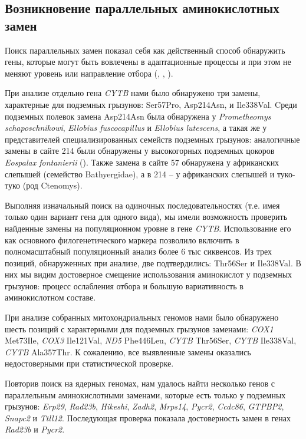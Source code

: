 \subsection{Возникновение параллельных аминокислотных замен}

Поиск параллельных замен показал себя как действенный способ обнаружить гены, которые могут быть вовлечены в адаптационные процессы и при этом не меняют уровень или направление отбора (\cite{Davies2018}, \cite{Zhou2015}, \cite{Sackman2017}). 

При анализе отдельно гена \textit{CYTB} нами было обнаружено три замены, характерные для подземных грызунов: Ser57Pro, Asp214Asn, и Ile338Val. Cреди подземных полевок замена Asp214Asn была обнаружена у \textit{Prometheomys schaposchnikowi}, \textit{Ellobius fuscocapillus} и \textit{Ellobius lutescens}, а такая же у представителей специализированных семейств подземных грызунов: аналогичные замены в сайте 214 были обнаружены у высокогорных подземных цокоров \textit{Eospalax fontanierii} (\cite{Cooper1993}). Также замена в сайте 57 обнаружена у африканских слепышей (семейство Bathyergidae), а в 214 -- у африканских слепышей и туко-туко (род Ctenomys).  

Выполняя изначальный поиск на одиночных последовательностях (т.е. имея только один вариант гена для одного вида), мы имели возможность проверить найденные замены на популяционном уровне в гене \textit{CYTB}. Использование его как основного филогенетического маркера позволило включить в полномасштабный популяционный анализ более 6 тыс сиквенсов. Из трех позиций, обнаруженных при анализе, две подтвердились: Thr56Ser и Ile338Val. В них мы видим достоверное смещение использования аминокислот у подземных грызунов: процесс ослабления отбора и большую вариативность в аминокислотном составе. 


При анализе собранных митохондриальных геномов нами было обнаружено шесть позиций с характерными для подземных грызунов заменами: \textit{COX1} Met73Ile, \textit{COX3} Ile121Val, \textit{ND5} Phe446Leu, \textit{CYTB} Thr56Ser, \textit{CYTB} Ile338Val, \textit{CYTB} Ala357Thr. К сожалению, все выявленные замены оказались недостоверными при статистической проверке. 

 
Повторив поиск на ядерных геномах, нам удалось найти несколько генов с параллельным аминокислотными заменами, которые есть только у подземных грызунов: \textit{Erp29}, \textit{Rad23b}, \textit{Hikeshi}, \textit{Zadh2}, \textit{Mrps14}, \textit{Pycr2}, \textit{Ccdc86}, \textit{GTPBP2}, \textit{Snapc2} и \textit{Ttll12}. Последующая проверка показала достоверность замен в генах \textit{Rad23b} и \textit{Pycr2}.
            
